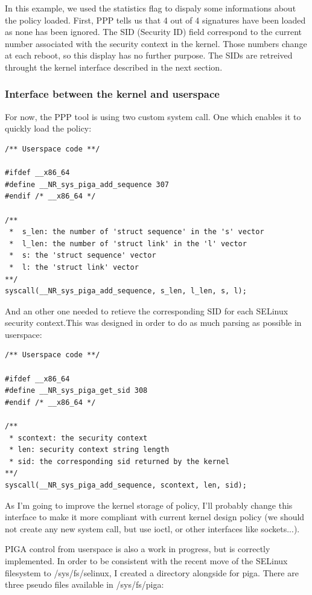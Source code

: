 \documentclass[pdftex,a4paper,titlepage,11pt]{article}
\begin{document}
\smallskip

In this example, we used the statistics flag to dispaly some informations about the policy loaded. First, PPP tells us that 4 out of 4 signatures have been loaded as none has been ignored. The SID (Security ID) field correspond to the current number associated with the security context in the kernel. Those numbers change at each reboot, so this display has no further purpose. The SIDs are retreived throught the kernel interface described in the next section.

\subsubsection{Interface between the kernel and userspace}

For now, the PPP tool is using two custom system call. One which enables it to quickly load the policy:

\begin{lstlisting}
/** Userspace code **/

#ifdef __x86_64
#define __NR_sys_piga_add_sequence 307
#endif /* __x86_64 */

/**
 *  s_len: the number of 'struct sequence' in the 's' vector
 *  l_len: the number of 'struct link' in the 'l' vector
 *  s: the 'struct sequence' vector
 *  l: the 'struct link' vector
**/
syscall(__NR_sys_piga_add_sequence, s_len, l_len, s, l);
\end{lstlisting}

And an other one needed to retieve the corresponding SID for each SELinux security context.This was designed in order to do as much parsing as possible in userspace:

\begin{lstlisting}
/** Userspace code **/

#ifdef __x86_64
#define __NR_sys_piga_get_sid 308
#endif /* __x86_64 */

/**
 * scontext: the security context
 * len: security context string length
 * sid: the corresponding sid returned by the kernel
**/
syscall(__NR_sys_piga_add_sequence, scontext, len, sid);
\end{lstlisting}

As I'm going to improve the kernel storage of policy, I'll probably change this interface to make it more compliant with current kernel design policy (we should not create any new system call, but use ioctl, or other interfaces like sockets...).

PIGA control from userspace is also a work in progress, but is correctly implemented. In order to be consistent with the recent move of the SELinux filesystem to /sys/fs/selinux, I created a directory alongside for piga. There are three pseudo files available in /sys/fs/piga: %
\end{document}
